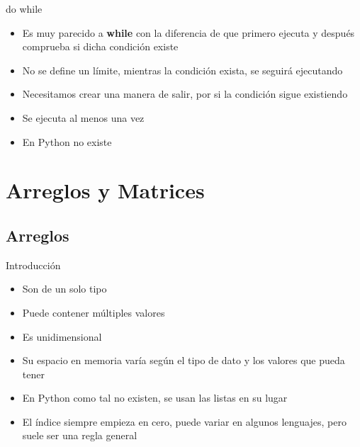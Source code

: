 \documentclass{beamer}
\begin{document}
\begin{frame}{do while}
    \begin{itemize}
            \item Es muy parecido a \textbf{while} con la diferencia de que primero ejecuta y despu\'es comprueba si dicha condici\'on existe
            \item No se define un l\'imite, mientras la condici\'on exista, se seguir\'a ejecutando
            \item Necesitamos crear una manera de salir, por si la condici\'on sigue existiendo
            \item Se ejecuta al menos una vez
            \item En Python no existe
        \end{itemize}
\end{frame}

\section{Arreglos  y Matrices}

\subsection{Arreglos}
\begin{frame}{Introducci\'on}
    \begin{itemize}
            \item Son de un solo tipo
            \item Puede contener m\'ultiples valores
            \item Es unidimensional
            \item Su espacio en memoria var\'ia seg\'un el tipo de dato y los valores que pueda tener
            \item En Python como tal no existen,  se usan las listas en su lugar
            \item El \'indice siempre empieza en cero, puede variar en algunos lenguajes, pero suele ser una regla general
        \end{itemize}
\end{frame}
\end{document}
